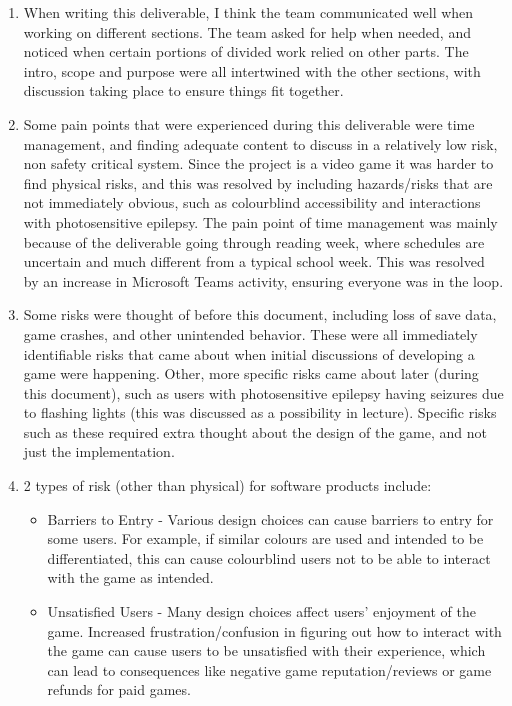 \documentclass{article}
\begin{document}
\begin{enumerate}
	\item When writing this deliverable, I think the team communicated well 
	when working on different sections. The team asked for help when needed, 
	and noticed when certain portions of divided work relied on other parts. 
	The intro, scope and purpose were all intertwined with the other sections, 
	with discussion taking place to ensure things fit together.

	\item Some pain points that were experienced during this deliverable were 
	time management, and finding adequate content to discuss in a relatively low 
	risk, non safety critical system. Since the project is a video game it was harder 
	to find physical risks, and this was resolved by including hazards/risks that are 
	not immediately obvious, such as colourblind accessibility and interactions with 
	photosensitive epilepsy. The pain point of time management was mainly because 
	of the deliverable going through reading week, where schedules are uncertain 
	and much different from a typical school week. This was resolved by an increase 
	in Microsoft Teams activity, ensuring everyone was in the loop.

	\item Some risks were thought of before this document, including loss of save 
	data, game crashes, and other unintended behavior. These were all immediately 
	identifiable risks that came about when initial discussions of developing a game 
	were happening. Other, more specific risks came about later (during this document), 
	such as users with photosensitive epilepsy having seizures due to flashing lights 
	(this was discussed as a possibility in lecture). Specific risks such as these required 
	extra thought about the design of the game, and not just the implementation.

	\item 2 types of risk (other than physical) for software products include:
	\begin{itemize}
		\item Barriers to Entry - Various design choices can cause barriers to entry 
		for some users. For example, if similar colours are used and intended to be 
		differentiated, this can cause colourblind users not to be able to interact with 
		the game as intended.

		\item Unsatisfied Users - Many design choices affect users' enjoyment of the 	
		game. Increased frustration/confusion in figuring out how to interact with the 
		game can cause users to be unsatisfied with their experience, which can lead 
		to consequences like negative game reputation/reviews or game refunds for paid games. 
	\end{itemize}
\end{enumerate}
\end{document}
